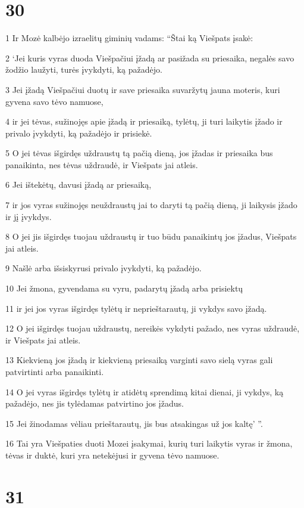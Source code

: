\chapter{30}


\par 1 Ir Mozė kalbėjo izraelitų giminių vadams: “Štai ką Viešpats įsakė: 
\par 2 ‘Jei kuris vyras duoda Viešpačiui įžadą ar pasižada su priesaika, negalės savo žodžio laužyti, turės įvykdyti, ką pažadėjo. 
\par 3 Jei įžadą Viešpačiui duotų ir save priesaika suvaržytų jauna moteris, kuri gyvena savo tėvo namuose, 
\par 4 ir jei tėvas, sužinojęs apie įžadą ir priesaiką, tylėtų, ji turi laikytis įžado ir privalo įvykdyti, ką pažadėjo ir prisiekė. 
\par 5 O jei tėvas išgirdęs uždraustų tą pačią dieną, jos įžadas ir priesaika bus panaikinta, nes tėvas uždraudė, ir Viešpats jai atleis. 
\par 6 Jei ištekėtų, davusi įžadą ar priesaiką, 
\par 7 ir jos vyras sužinojęs neuždraustų jai to daryti tą pačią dieną, ji laikysis įžado ir jį įvykdys. 
\par 8 O jei jis išgirdęs tuojau uždraustų ir tuo būdu panaikintų jos įžadus, Viešpats jai atleis. 
\par 9 Našlė arba išsiskyrusi privalo įvykdyti, ką pažadėjo. 
\par 10 Jei žmona, gyvendama su vyru, padarytų įžadą arba prisiektų 
\par 11 ir jei jos vyras išgirdęs tylėtų ir neprieštarautų, ji vykdys savo įžadą. 
\par 12 O jei išgirdęs tuojau uždraustų, nereikės vykdyti pažado, nes vyras uždraudė, ir Viešpats jai atleis. 
\par 13 Kiekvieną jos įžadą ir kiekvieną priesaiką varginti savo sielą vyras gali patvirtinti arba panaikinti. 
\par 14 O jei vyras išgirdęs tylėtų ir atidėtų sprendimą kitai dienai, ji vykdys, ką pažadėjo, nes jis tylėdamas patvirtino jos įžadus. 
\par 15 Jei žinodamas vėliau prieštarautų, jis bus atsakingas už jos kaltę’ ”. 
\par 16 Tai yra Viešpaties duoti Mozei įsakymai, kurių turi laikytis vyras ir žmona, tėvas ir duktė, kuri yra netekėjusi ir gyvena tėvo namuose.



\chapter{31}

